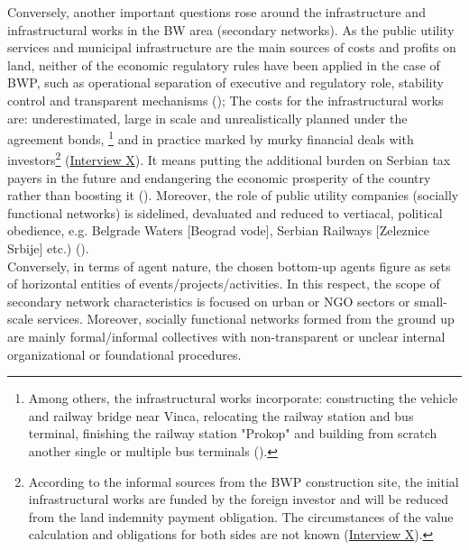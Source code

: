 \documentclass[11pt]{report}
\begin{document}
Conversely, another important questions rose around the infrastructure and infrastructural works in the BW area (secondary networks).
As the public utility services and municipal infrastructure are the main sources of costs and profits on land, neither of the economic regulatory rules have been applied in the case of BWP, such as operational separation of executive and regulatory role, stability control and transparent mechanisms (\cite{SKGO2013});
The costs for the infrastructural works are: underestimated, large in scale and unrealistically planned under the agreement bonds,
\footnote{Among others, the infrastructural works incorporate: constructing the vehicle and railway bridge near Vinca, relocating the railway station and bus terminal, finishing the railway station "Prokop" and building from scratch another single or multiple bus terminals (\href{Politike}{\cite{Politika2015}}).}
and in practice marked by murky financial deals with investors\footnote{According to the informal sources from the BWP construction site, the initial infrastructural works are funded by the foreign investor and will be reduced from the land indemnity payment obligation. The circumstances of the value calculation and obligations for both sides are not known (\href{InterviewX}{Interview X}).} 
(\href{InterviewX}{Interview X}).
It means putting the additional burden on Serbian tax payers in the future and endangering the economic prosperity of the country rather than boosting it (\cite{ref media}).
Moreover, the role of public utility companies (socially functional networks) is sidelined, devaluated and reduced to vertiacal, political obedience, {e.g. Belgrade Waters [Beograd vode], Serbian Railways [Zeleznice Srbije] etc.)} (\cite{ref media}).
\\

Conversely, in terms of agent nature, the chosen bottom-up agents figure as sets of horizontal entities of events/projects/activities. In this respect, the scope of secondary network characteristics is focused on urban or NGO sectors or small-scale services.
Moreover, socially functional networks formed from the ground up are mainly formal/informal collectives with non-transparent or unclear internal organizational or foundational procedures.
\\
\end{document}
